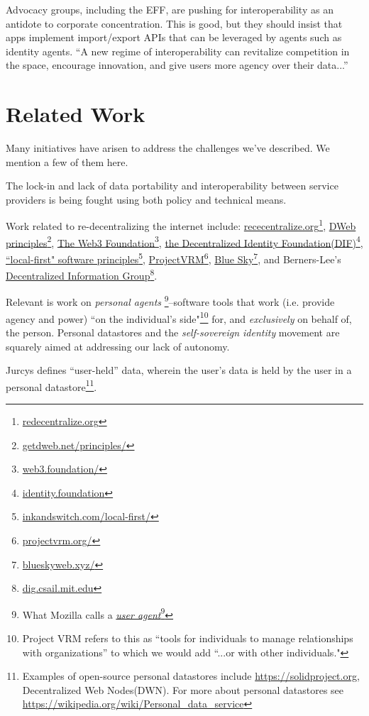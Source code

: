 \documentclass[11pt, oneside]{article}   	%
\newcommand{\hyperfootnote}[1][]{\def\ArgI{{#1}}\hyperfootnoteRelay}
\newcommand\hyperfootnoteRelay[2][]{\href{#1#2}{\ArgI}\footnote{\href{#1#2}{#2}}}
\begin{document}
Advocacy groups, including the EFF, are pushing for interoperability as an antidote to corporate concentration. This is good, but they should insist that apps implement import/export APIs that can be leveraged by agents such as identity agents. ``A new regime of interoperability can revitalize competition in the space, encourage innovation, and give users more agency over their data...''\cite{Cyphers2021} 

\section{Related Work} %

Many initiatives have arisen to address the challenges we've described. We mention a few of them here.

The lock-in and lack of data portability and interoperability between service providers is being fought using both policy and technical means\cite{Doctorow2021}\cite{Cyphers2021}. 

Work related to re-decentralizing the internet include: \hyperfootnote[rececentralize.org][https://]{redecentralize.org}, \hyperfootnote[DWeb principles][https://]{getdweb.net/principles/}, \hyperfootnote[The Web3 Foundation][https://]{web3.foundation/}, \hyperfootnote[the Decentralized Identity Foundation(DIF)][https://]{identity.foundation}, \hyperfootnote[``local-first" software principles][https://]{inkandswitch.com/local-first/}, \hyperfootnote[ProjectVRM][https://]{projectvrm.org/}, \hyperfootnote[Blue Sky][https://]{blueskyweb.xyz/}, and Berners-Lee's \hyperfootnote[Decentralized Information Group][https://]{dig.csail.mit.edu}. 

Relevant is work on \emph{personal agents} \footnote{What Mozilla calls a \hyperfootnote[\emph{user agent}][https://]{developer.mozilla.org/en-US/docs/Glossary/User\_agent}}--software tools that work (i.e. provide agency and power) ``on the individual's side"\footnote{Project VRM\cite{Searls2019} refers to this as ``tools for individuals to manage relationships with organizations'' to which we would add ``...or with other individuals."} for, and \emph{exclusively} on behalf of, the person. Personal datastores and the \emph{self-sovereign identity}\cite{Preukschat2021} movement are squarely aimed at addressing our lack of autonomy.

Jurcys defines ``user-held'' data\cite{Jurcys2021}, wherein the user's data is held by the user in a personal datastore\footnote{Examples of open-source personal datastores include \url{https://solidproject.org}, Decentralized Web Nodes(DWN). For more about personal datastores see \url{https://wikipedia.org/wiki/Personal\_data\_service}}. 
\end{document}
